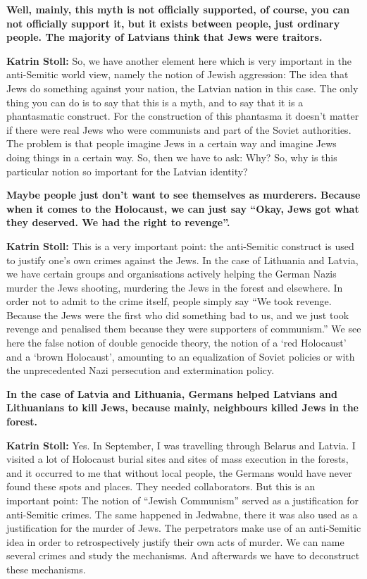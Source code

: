 \textbf{Well, mainly, this myth is not officially supported, of course, you can not officially support it, but it exists between people, just ordinary people. The majority of Latvians think that Jews were traitors.} 

\textbf{Katrin Stoll:} So, we have another element here which is very important in the anti-Semitic world view, namely the notion of Jewish aggression: The idea that Jews do something against your nation, the Latvian nation in this case. The only thing you can do is to say that this is a myth, and to say that it is a phantasmatic construct. For the construction of this phantasma it doesn’t matter if there were real Jews who were communists and part of the Soviet authorities. The problem is that people imagine Jews in a certain way and imagine Jews doing things in a certain way. So, then we have to ask: Why? So, why is this particular notion so important for the Latvian identity? 

\textbf{ Maybe people just don’t want to see themselves as murderers. Because when it comes to the Holocaust, we can just say “Okay, Jews got what they deserved. We had the right to revenge”.} 

\textbf{Katrin Stoll:} This is a very important point: the anti-Semitic construct is used to justify one’s own crimes against the Jews. In the case of Lithuania and Latvia, we have certain groups and organisations actively helping the German Nazis murder the Jews shooting, murdering the Jews in the forest and elsewhere. In order not to admit to the crime itself, people simply say “We took revenge. Because the Jews were the first who did something bad to us, and we just took revenge and penalised them because they were supporters of communism.” We see here the false notion of double genocide theory, the notion of a ‘red Holocaust’ and a ‘brown Holocaust’, amounting to an equalization of Soviet policies or with the unprecedented Nazi persecution and extermination policy.  

\textbf{In the case of Latvia and Lithuania, Germans helped Latvians and Lithuanians to kill Jews, because mainly, neighbours killed Jews in the forest.}

\textbf{Katrin Stoll:} Yes. In September, I was travelling through Belarus and Latvia. I visited a lot of Holocaust burial sites and sites of mass execution in the forests, and it occurred to me that without local people, the Germans would have never found these spots and places. They needed collaborators.  But this is an important point: The notion of “Jewish Communism” served as a justification for anti-Semitic crimes. The same happened in Jedwabne, there it was also used as a justification for the murder of Jews. The perpetrators make use of an anti-Semitic idea in order to retrospectively justify their own acts of murder. We can name several crimes and study the mechanisms. And afterwards we have to deconstruct these mechanisms. 

